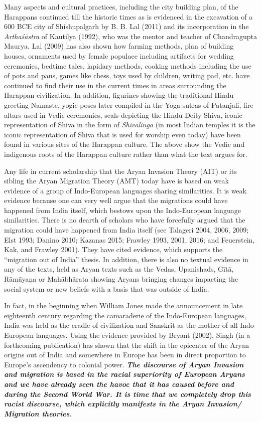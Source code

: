 \noindent
Many aspects and cultural practices, including the city building plan, of the Harappans continued till the historic times as is evidenced in the excavation of a 600 BCE city of Shishupalgarh by B. B. Lal (2011) and its incorporation in the \textit{Arthaśāstra} of Kautilya (1992), who was the mentor and teacher of Chandragupta Maurya. Lal (2009) has also shown how farming methods, plan of building houses, ornaments used by female populace including artifacts for wedding ceremonies, bedtime tales, lapidary methods, cooking methods including the use of pots and pans, games like chess, toys used by children, writing pad, etc. have continued to find their use in the current times in areas surrounding the Harappan civilization. In addition, figurines showing the traditional Hindu greeting Namaste, yogic poses later compiled in the Yoga sutras of Patanjali, fire altars used in Vedic ceremonies, seals depicting the Hindu Deity Shiva, iconic representation of Shiva in the form of \textit{Shivalinga} (in most Indian temples it is the iconic representation of Shiva that is used for worship even today) have been found in various sites of the Harappan culture. The above show the Vedic and indigenous roots of the Harappan culture rather than what the text argues for. 

Any life in current scholarship that the Aryan Invasion Theory (AIT) or its sibling the Aryan Migration Theory (AMT) today have is based on weak evidence of a group of Indo-European languages sharing similarities. It is weak evidence because one can very well argue that the migrations could have happened from India itself, which bestows upon the Indo-European language similarities. There is no dearth of scholars who have forcefully argued that the migration could have happened from India itself (see Talageri 2004, 2006, 2009; Elst 1993; Danino 2010; Kazanas 2015; Frawley 1993, 2001, 2016; and Feuerstein, Kak, and Frawley 2001). They have cited evidence, which supports the “migration out of India” thesis. In addition, there is also no textual evidence in any of the texts, held as Aryan texts such as the Vedas, Upanishads, Gītā, Rāmāyaṇa or Mahābhārata showing Aryans bringing changes impacting the social system or new beliefs with a basis that was outside of India.

In fact, in the beginning when William Jones made the announcement in late eighteenth century regarding the camaraderie of the Indo-European languages, India was held as the cradle of civilization and Sanskrit as the mother of all Indo-European languages. Using the evidence provided by Bryant (2002), Singh (in a forthcoming publication) has shown that the shift in the epicenter of the Aryan origins out of India and somewhere in Europe has been in direct proportion to Europe’s ascendency to colonial power. \textit{\textbf{The discourse of Aryan Invasion and migration is based in the racial superiority of European Aryans and we have already seen the havoc that it has caused before and during the Second World War. It is time that we completely drop this racist discourse, which explicitly manifests in the Aryan Invasion/ Migration theories.}} 

